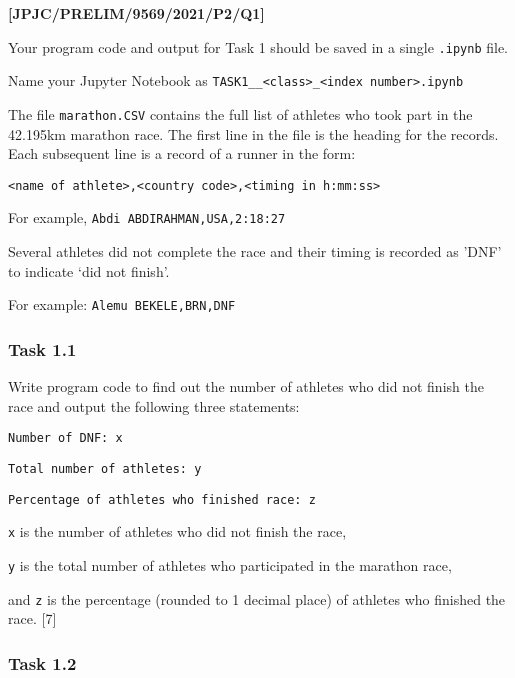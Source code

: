 \item \textbf{{[}JPJC/PRELIM/9569/2021/P2/Q1{]} }

Your program code and output for Task 1 should be saved in a single
\texttt{.ipynb} file. 

Name your Jupyter Notebook as \texttt{TASK1\_<your name>\_<class>\_<index
number>.ipynb }

The file \texttt{marathon.CSV} contains the full list of athletes
who took part in the 42.195km marathon race. The first line in the
file is the heading for the records. Each subsequent line is a record
of a runner in the form: 
\noindent \begin{center}
\texttt{<name of athlete>,<country code>,<timing in h:mm:ss>} 
\par\end{center}

For example, \texttt{Abdi ABDIRAHMAN,USA,2:18:27} 

Several athletes did not complete the race and their timing is recorded
as 'DNF' to indicate \textquoteleft did not finish\textquoteright . 

For example: \texttt{Alemu BEKELE,BRN,DNF }

\subsubsection*{Task 1.1 }

Write program code to find out the number of athletes who did not
finish the race and output the following three statements: 

\noindent %
\noindent\begin{minipage}[t]{1\columnwidth}%
\texttt{Number of DNF: x }

\texttt{Total number of athletes: y }

\texttt{Percentage of athletes who finished race: z }%
\end{minipage}

\texttt{x} is the number of athletes who did not finish the race, 

\texttt{y} is the total number of athletes who participated in the
marathon race, 

and \texttt{z} is the percentage (rounded to 1 decimal place) of athletes
who finished the race.\hfill{} {[}7{]}

\subsubsection*{Task 1.2 }

